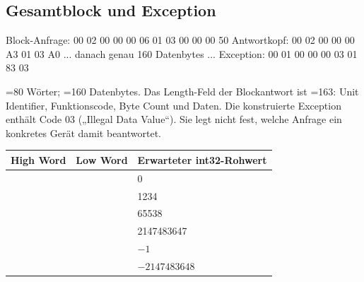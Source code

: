 \documentclass[10pt,a4paper]{article}
\begin{document}
\subsection{Gesamtblock und Exception}
\begin{CodeBlock}
Block-Anfrage: 00 02 00 00 00 06 01 03 00 00 00 50
Antwortkopf:  00 02 00 00 00 A3 01 03 A0
              ... danach genau 160 Datenbytes ...
Exception:    00 01 00 00 00 03 01 83 03
\end{CodeBlock}
=80 Wörter; =160 Datenbytes. Das Length-Feld der Blockantwort ist =163: Unit Identifier, Funktionscode, Byte Count und Daten. Die konstruierte Exception enthält Code 03 („Illegal Data Value“). Sie legt nicht fest, welche Anfrage ein konkretes Gerät damit beantwortet.

\par\noindent\begin{tabularx}{\linewidth}{@{}L{30mm}L{30mm}X@{}}
\toprule\textbf{High Word}&\textbf{Low Word}&\textbf{Erwarteter int32-Rohwert}\\\midrule
{}&&0\\
&&1234\\
&&65538\\
&&2147483647\\
&&$-1$\\
&&$-2147483648$\\\bottomrule
\end{tabularx}\par
\end{document}
